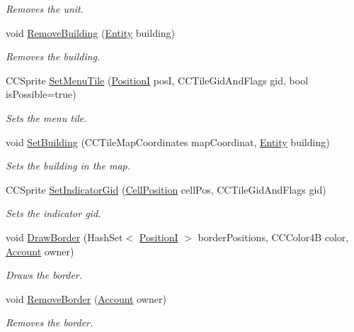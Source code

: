 \begin{DoxyCompactItemize}
\begin{DoxyCompactList}\small\item\em Removes the unit. \end{DoxyCompactList}\item 
void \hyperlink{classClient_1_1Common_1_1Views_1_1RegionViewHex_a805462c8c8197d172aa0014cf5d34a31}{Remove\+Building} (\hyperlink{classCore_1_1Models_1_1Entity}{Entity} building)
\begin{DoxyCompactList}\small\item\em Removes the building. \end{DoxyCompactList}\item 
C\+C\+Sprite \hyperlink{classClient_1_1Common_1_1Views_1_1RegionViewHex_a549bcaf14be905649db8aca4306d8d69}{Set\+Menu\+Tile} (\hyperlink{classCore_1_1Models_1_1PositionI}{Position\+I} pos\+I, C\+C\+Tile\+Gid\+And\+Flags gid, bool is\+Possible=true)
\begin{DoxyCompactList}\small\item\em Sets the menu tile. \end{DoxyCompactList}\item 
void \hyperlink{classClient_1_1Common_1_1Views_1_1RegionViewHex_a1ce045fb1360582c30095314addf6ce8}{Set\+Building} (C\+C\+Tile\+Map\+Coordinates map\+Coordinat, \hyperlink{classCore_1_1Models_1_1Entity}{Entity} building)
\begin{DoxyCompactList}\small\item\em Sets the building in the map. \end{DoxyCompactList}\item 
C\+C\+Sprite \hyperlink{classClient_1_1Common_1_1Views_1_1RegionViewHex_ada8489098bf54de0480ece85230008b5}{Set\+Indicator\+Gid} (\hyperlink{classCore_1_1Models_1_1CellPosition}{Cell\+Position} cell\+Pos, C\+C\+Tile\+Gid\+And\+Flags gid)
\begin{DoxyCompactList}\small\item\em Sets the indicator gid. \end{DoxyCompactList}\item 
void \hyperlink{classClient_1_1Common_1_1Views_1_1RegionViewHex_aa41679925b0df9e9509fc0b1c2ee9f31}{Draw\+Border} (Hash\+Set$<$ \hyperlink{classCore_1_1Models_1_1PositionI}{Position\+I} $>$ border\+Positions, C\+C\+Color4\+B color, \hyperlink{classCore_1_1Models_1_1Account}{Account} owner)
\begin{DoxyCompactList}\small\item\em Draws the border. \end{DoxyCompactList}\item 
void \hyperlink{classClient_1_1Common_1_1Views_1_1RegionViewHex_a29ca36596c21ba8db02e734c550d3f67}{Remove\+Border} (\hyperlink{classCore_1_1Models_1_1Account}{Account} owner)
\begin{DoxyCompactList}\small\item\em Removes the border. \end{DoxyCompactList}\end{DoxyCompactItemize}
